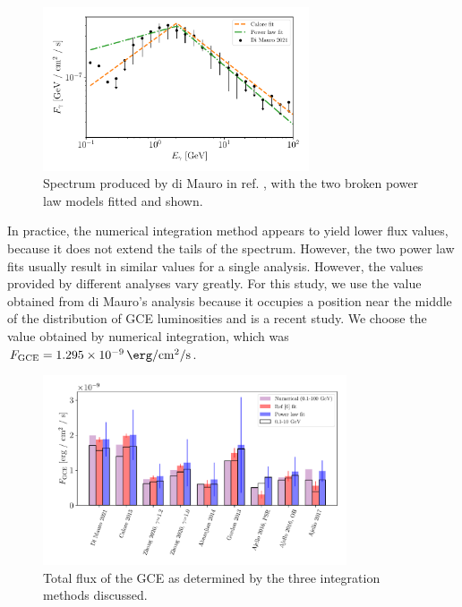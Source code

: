 \documentclass[a4paper,11pt]{article}
\newcommand{\comment}[1]{\emph{\color{red}{#1}}}
\begin{document}
\begin{figure}
    \centering
    \includegraphics[width=0.7\textwidth]{figs/di-mauro-example.pdf}
    \caption{Spectrum produced by di Mauro in ref. \cite{DiMauro:2021raz}, with the two broken power law models fitted and shown.}
    \label{fig:di-mauro-example}
\end{figure}

In practice, the numerical integration method appears to yield lower flux values, because it does not extend the tails of the spectrum. However, the two power law fits usually result in similar values for a single analysis. However, the values provided by different analyses vary greatly. For this study, we use the value obtained from di Mauro's analysis because it occupies a position near the middle of the distribution of GCE luminosities \comment{(Not anymore!)} and is a recent study. We choose the value obtained by numerical integration, which was $F_\text{GCE} = \SI{1.295e-9}{\erg\per\centi\meter\squared\per\second}$.

\begin{figure}
    \centering
    \includegraphics[width=0.8\textwidth]{figs/total-flux-bars.pdf}
    \caption{Total flux of the GCE as determined by the three integration methods discussed.}
    \label{fig:total-flux-bars}
\end{figure}
\end{document}
